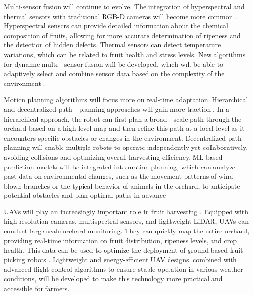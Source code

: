 \documentclass{ieeeaccess}
\begin{document}
Multi-sensor fusion will continue to evolve. The integration of hyperspectral and thermal sensors with traditional RGB-D cameras will become more common \cite{mohamed2021smart, martos2021ensuring}. Hyperspectral sensors can provide detailed information about the chemical composition of fruits, allowing for more accurate determination of ripeness and the detection of hidden defects. Thermal sensors can detect temperature variations, which can be related to fruit health and stress levels. New algorithms for dynamic multi - sensor fusion will be developed, which will be able to adaptively select and combine sensor data based on the complexity of the environment \cite{liu2024hierarchical}.

Motion planning algorithms will focus more on real-time adaptation. Hierarchical and decentralized path - planning approaches will gain more traction \cite{lytridis2021overview, li2023multi}. In a hierarchical approach, the robot can first plan a broad - scale path through the orchard based on a high-level map and then refine this path at a local level as it encounters specific obstacles or changes in the environment. Decentralized path planning will enable multiple robots to operate independently yet collaboratively, avoiding collisions and optimizing overall harvesting efficiency. ML-based prediction models will be integrated into motion planning, which can analyze past data on environmental changes, such as the movement patterns of wind-blown branches or the typical behavior of animals in the orchard, to anticipate potential obstacles and plan optimal paths in advance \cite{rajendran2024towards}.

UAVs will play an increasingly important role in fruit harvesting \cite{mohamed2021smart, martos2021ensuring}. Equipped with high-resolution cameras, multispectral sensors, and lightweight LiDAR, UAVs can conduct large-scale orchard monitoring. They can quickly map the entire orchard, providing real-time information on fruit distribution, ripeness levels, and crop health. This data can be used to optimize the deployment of ground-based fruit-picking robots \cite{martos2021ensuring}. Lightweight and energy-efficient UAV designs, combined with advanced flight-control algorithms to ensure stable operation in various weather conditions, will be developed to make this technology more practical and accessible for farmers.
\end{document}
